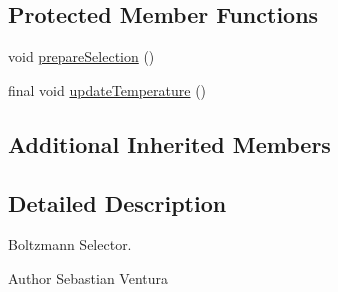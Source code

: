 \subsection*{Protected Member Functions}
\begin{DoxyCompactItemize}
\item 
void \hyperlink{classnet_1_1sf_1_1jclec_1_1selector_1_1_boltzmann_selector_a6edd0857b95771a97a1484b98ebc2fb0}{prepare\-Selection} ()
\item 
final void \hyperlink{classnet_1_1sf_1_1jclec_1_1selector_1_1_boltzmann_selector_a3436a5c3fa67afe7e1af7704841ab489}{update\-Temperature} ()
\end{DoxyCompactItemize}
\subsection*{Additional Inherited Members}


\subsection{Detailed Description}
Boltzmann Selector.

\begin{DoxyAuthor}{Author}
Sebastian Ventura 
\end{DoxyAuthor}


